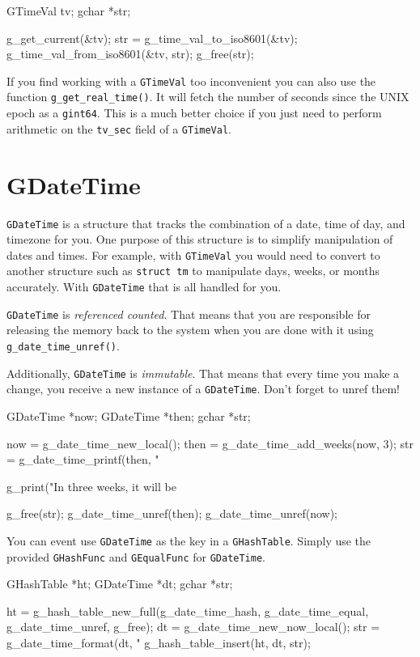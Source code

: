 \begin{code}{}
GTimeVal tv;
gchar *str;

g_get_current(&tv);
str = g_time_val_to_iso8601(&tv);
g_time_val_from_iso8601(&tv, str);
g_free(str);
\end{code}

If you find working with a \verb|GTimeVal| too inconvenient you can also use the function \verb|g_get_real_time()|.
It will fetch the number of seconds since the UNIX epoch as a \verb|gint64|.
This is a much better choice if you just need to perform arithmetic on the \verb|tv_sec| field of a \verb|GTimeVal|.


\section{GDateTime}

\verb|GDateTime| is a structure that tracks the combination of a date, time of day, and timezone for you.
One purpose of this structure is to simplify manipulation of dates and times.
For example, with \verb|GTimeVal| you would need to convert to another structure such as \verb|struct tm| to manipulate days, weeks, or months accurately.
With \verb|GDateTime| that is all handled for you.

\verb|GDateTime| is \emph{referenced counted}.
That means that you are responsible for releasing the memory back to the system when you are done with it using \verb|g_date_time_unref()|.

Additionally, \verb|GDateTime| is \emph{immutable}.
That means that every time you make a change, you receive a new instance of a \verb|GDateTime|.
Don't forget to unref them!

\begin{code}{}
GDateTime *now;
GDateTime *then;
gchar *str;

now = g_date_time_new_local();
then = g_date_time_add_weeks(now, 3);
str = g_date_time_printf(then, "%

g_print("In three weeks, it will be %

g_free(str);
g_date_time_unref(then);
g_date_time_unref(now);
\end{code}

You can event use \verb|GDateTime| as the key in a \verb|GHashTable|.
Simply use the provided \verb|GHashFunc| and \verb|GEqualFunc| for \verb|GDateTime|.

\begin{code}{}
GHashTable *ht;
GDateTime *dt;
gchar *str;

ht = g_hash_table_new_full(g_date_time_hash,
                           g_date_time_equal,
                           g_date_time_unref,
                           g_free);
dt = g_date_time_new_now_local();
str = g_date_time_format(dt, "%
g_hash_table_insert(ht, dt, str);
\end{code}


